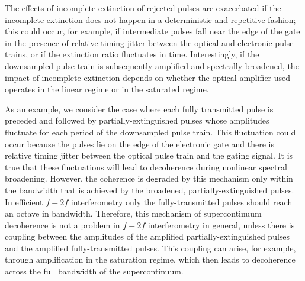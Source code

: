 The effects of incomplete extinction of rejected pulses are exacerbated if the incomplete extinction does not happen in a deterministic and repetitive fashion; this could occur, for example, if intermediate pulses fall near the edge of the gate in the presence of relative timing jitter between the optical and electronic pulse trains, or if the extinction ratio fluctuates in time. Interestingly, if the downsampled pulse train is subsequently amplified and spectrally broadened, the impact of incomplete extinction depends on whether the optical amplifier used operates in the linear regime or in the saturated regime.

As an example, we consider the case where each fully transmitted pulse is preceded and followed by partially-extinguished pulses whose amplitudes fluctuate for each period of the downsampled pulse train. This fluctuation could occur because the pulses lie on the edge of the electronic gate and there is relative timing jitter between the optical pulse train and the gating signal. It is true that these fluctuations will lead to decoherence during nonlinear spectral broadening. However, the coherence is degraded by this mechanism only within the bandwidth that is achieved by the broadened, partially-extinguished pulses. In efficient $f-2f$ interferometry only the fully-transmitted pulses should reach an octave in bandwidth.  Therefore, this mechanism of supercontinuum decoherence is not a problem in $f-2f$ interferometry in general, unless there is coupling between the amplitudes of the amplified partially-extinguished pulses and the amplified fully-transmitted pulses. This coupling can arise, for example, through amplification in the saturation regime, which then leads to decoherence across the full bandwidth of the supercontinuum. 

